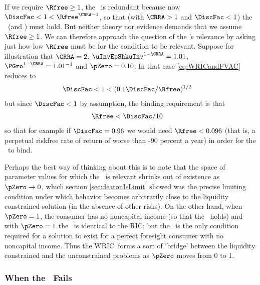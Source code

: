 \documentclass[BufferStockTheory]{subfiles}
\begin{document}
If we require $\Rfree \geq 1$, the \WRIC~is redundant because now $\DiscFac <1<\Rfree^{\CRRA-1}$, so that (with $\CRRA > 1$ and $\DiscFac<1$) the \RIC~(and \WRIC) must hold.  But neither theory nor evidence demands that we assume $\Rfree \geq
1$.  We can therefore approach the question of the \WRIC's relevance by
asking just how low $\Rfree$ must be for the condition to be relevant.
Suppose for illustration that $\CRRA=2$, $\uInvEpShkuInv^{1-\CRRA}=1.01$,
$\PGro^{1-\CRRA}=1.01^{-1}$ and $\pZero = 0.10$.  In that case
\eqref{eq:WRICandFVAC} reduces to
\begin{align*}
  \DiscFac  & < 1 < (0.1 \DiscFac/\Rfree)^{1/2} 
\end{align*}
but since $\DiscFac < 1$ by assumption, the binding requirement is that
\begin{align*}
  \Rfree  & < \DiscFac/10 \notag
\end{align*}
so that for example if $\DiscFac=0.96$ we would need $\Rfree < 0.096$
(that is, a perpetual riskfree rate of return of worse than -90
percent a year) in order for the \WRIC~to bind.

Perhaps the best way of thinking about this is to note that the space
of parameter values for which the \WRIC~is relevant shrinks out of
existence as $\pZero \rightarrow 0$, which section
\ref{sec:deatonIsLimit} showed was the precise limiting condition
under which behavior becomes arbitrarily close to the liquidity
constrained solution (in the absence of other risks).  On the other
hand, when $\pZero = 1$, the consumer has no noncapital income (so
that the \FHWC~holds) and with $\pZero=1$ the \WRIC~is identical to the
RIC; but the \RIC~is
the only condition required for a solution to exist
for a perfect foresight consumer with no noncapital income.  Thus the
WRIC~forms a sort of `bridge' between the liquidity constrained and
the unconstrained problems as $\pZero$ moves from 0 to 1.

\hypertarget{IntuitionRIC}{}
\subsubsection{When the \RIC~Fails}\label{subsubsec:WhenTheRICFails}
\end{document}
